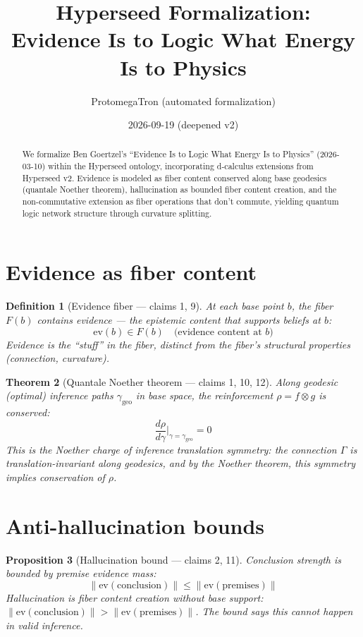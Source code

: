 \documentclass[11pt,a4paper]{article}
\title{Hyperseed Formalization:\\
  Evidence Is to Logic What Energy Is to Physics}
\author{ProtomegaTron (automated formalization)}
\date{2026-09-19 (deepened v2)}
\newtheorem{definition}{Definition}[section]
\newtheorem{theorem}[definition]{Theorem}
\newtheorem{proposition}[definition]{Proposition}
\begin{document}
\maketitle

\begin{abstract}
We formalize Ben Goertzel's ``Evidence Is to Logic What Energy Is to
Physics'' (2026-03-10) within the Hyperseed ontology, incorporating
d-calculus extensions from Hyperseed v2. Evidence is modeled as fiber
content conserved along base geodesics (quantale Noether theorem),
hallucination as bounded fiber content creation, and the non-commutative
extension as fiber operations that don't commute, yielding quantum
logic network structure through curvature splitting.
\end{abstract}

\tableofcontents

\section{Evidence as fiber content}

\begin{definition}[Evidence fiber --- claims 1, 9]
At each base point $b$, the fiber $F(b)$ contains \emph{evidence} ---
the epistemic content that supports beliefs at $b$:
\[
  \text{ev}(b) \in F(b) \quad \text{(evidence content at } b \text{)}
\]
Evidence is the ``stuff'' in the fiber, distinct from the fiber's
structural properties (connection, curvature).
\end{definition}

\begin{theorem}[Quantale Noether theorem --- claims 1, 10, 12]
\label{thm:noether}
Along geodesic (optimal) inference paths $\gamma_{\text{geo}}$ in base
space, the reinforcement $\rho = f \otimes g$ is conserved:
\[
  \frac{d\rho}{d\gamma}\bigg|_{\gamma = \gamma_{\text{geo}}} = 0
\]
This is the Noether charge of inference translation symmetry: the
connection $\Gamma$ is translation-invariant along geodesics, and
by the Noether theorem, this symmetry implies conservation of $\rho$.
\end{theorem}

\section{Anti-hallucination bounds}

\begin{proposition}[Hallucination bound --- claims 2, 11]
\label{prop:hallucination}
Conclusion strength is bounded by premise evidence mass:
\[
  \|\text{ev}(\text{conclusion})\| \leq \|\text{ev}(\text{premises})\|
\]
Hallucination is fiber content creation without base support:
$\|\text{ev}(\text{conclusion})\| > \|\text{ev}(\text{premises})\|$.
The bound says this cannot happen in valid inference.
\end{proposition}
\end{document}
